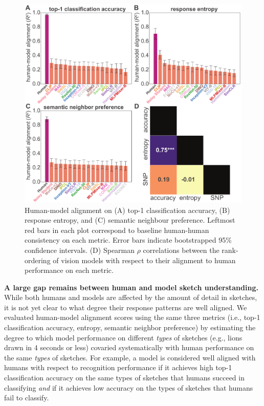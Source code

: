 \documentclass{article}
\begin{document}
\begin{figure}[htp!]
    \centering
    \includegraphics[width=.75\textwidth]{neurips_figures/neurips_reliability_edited_2x2.pdf}
    \caption{Human-model alignment on (A) top-1 classification accuracy, (B) response entropy, and (C) semantic neighbour preference. Leftmost red bars in each plot correspond to baseline human-human consistency on each metric. Error bars indicate bootstrapped 95\% confidence intervals. (D) Spearman $\rho$ correlations between the rank-ordering of vision models with respect to their alignment to human performance on each metric.}
    \label{fig:alignment}
    \vspace{-1em}
\end{figure}
\textbf{A large gap remains between human and model sketch understanding.}
While both humans and models are affected by the amount of detail in sketches, it is not yet clear to what degree their response patterns are well aligned. 
We evaluated human-model alignment scores using the same three metrics (i.e., top-1 classification accuracy, entropy, semantic neighbor preference) by estimating the degree to which model performance on different \textit{types} of sketches (e.g., lions drawn in 4 seconds or less) covaried systematically with human performance on the same \textit{types} of sketches. 
For example, a model is considered well aligned with humans with respect to recognition performance if it achieves high top-1 classification accuracy on the same types of sketches that humans succeed in classifying \textit{and} if it achieves low accuracy on the types of sketches that humans fail to classify. 
\end{document}
